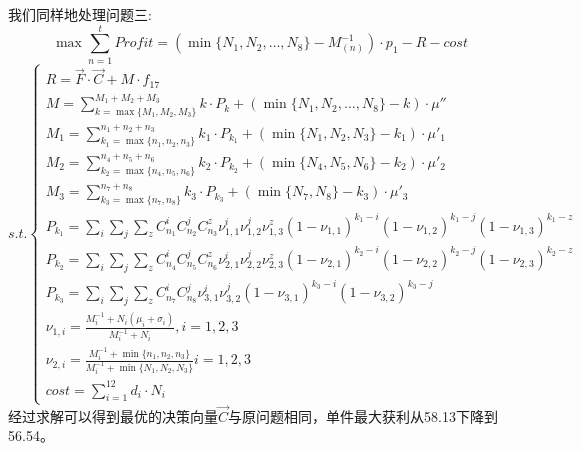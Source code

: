 \documentclass[withoutpreface,bwprint]{cumcmthesis} %
\begin{document}
我们同样地处理问题三:
$$\max    \sum_{n=1}^{t}\textit{Profit}=(\min \{N_{1},N_{2},\dots,N_{8}\}-M_{(n)}^{-1})\cdot p_{1}-R -cost$$
\begin{equation*}
    s.t.\begin{cases}
        R=\vec{F}\cdot \vec{C} + M\cdot f_{17}                                                                                                 \\
        M=\sum_{k=\max \{M_{1},M_{2},M_{3}\}}^{M_{1}+M_{2}+M_{3}}k\cdot P_{k}+(\min \{N_{1},N_{2},\dots,N_{8}\}-k)\cdot \mu''                  \\
        M_{1}=\sum_{k_{1}=\max \{n_{1},n_{2},n_{3}\}}^{n_{1}+n_{2}+n_{3}}k_{1}\cdot P_{k_{1}}+(\min \{N_{1},N_{2},N_{3}\}-k_{1})\cdot \mu'_{1} \\
        M_{2}=\sum_{k_{2}=\max \{n_{4},n_{5},n_{6}\}}^{n_{4}+n_{5}+n_{6}}k_{2}\cdot P_{k_{2}}+(\min \{N_{4},N_{5},N_{6}\}-k_{2})\cdot \mu'_{2} \\
        M_{3}=\sum_{k_{3}=\max \{n_{7},n_{8}\}}^{n_{7}+n_{8}}k_{3}\cdot P_{k_{3}}+(\min \{N_{7},N_{8}\}-k_{3})\cdot \mu'_{3}                   \\
        P_{k_{1}}=\sum_{i}\sum_{j}\sum_{z}C_{n_{1}}^{i}C_{n_{2}}^{j}C_{n_{3}}^{z}\nu_{1,1}^{i}\nu_{1,2}^{j}\nu_{1,3}^{z}(1-\nu_{1,1})^{k_{1}-i}(1-\nu_{1,2})^{k_{1}-j}(1-\nu_{
        1,3})^{k_{1}-z}                                                                                                                        \\
        P_{k_{2}}=\sum_{i}\sum_{j}\sum_{z}C_{n_{4}}^{i}C_{n_{5}}^{j}C_{n_{6}}^{z}\nu_{2,1}^{i}\nu_{2,2}^{j}\nu_{2,3}^{z}(1-\nu_{2,1})^{k_{2}-i}(1-\nu_{2,2})^{k_{2}-j}(1-\nu_{
        2,3})^{k_{2}-z}                                                                                                                        \\
        P_{k_{3}}=\sum_{i}\sum_{j}\sum_{z}C_{n_{7}}^{i}C_{n_{8}}^{j}\nu_{3,1}^{i}\nu_{3,2}^{j}(1-\nu_{3,1})^{k_{3}-i}(1-\nu_{3,2})^{k_{3}-j}   \\
        \nu_{1,i}=\frac{M_{i}^{-1}+N_{i}(\mu_{i}+\sigma_{i})}{M_{i}^{-1}+N_{i}} ,i=1,2,3                                                       \\
        \nu_{2,i}=\frac{M_{i}^{-1}+\min \{ n_{1},n_{2},n_{3}\}}{M_{i}^{-1}+\min \{N_{1},N_{2},N_{3}\}} i=1,2,3                                 \\
        cost = \sum_{i=1}^{12}d_{i}\cdot N_{i}
    \end{cases}
\end{equation*}
经过求解可以得到最优的决策向量$\vec{C}$与原问题相同，单件最大获利从58.13下降到56.54。
\end{document}
